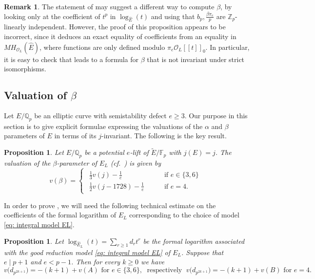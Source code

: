 \documentclass{amsart}
\newcommand{\Qp}{\mathbb{Q}_p}
\newtheorem{proposition}[theorem]{Proposition}
\theoremstyle{definition}
\newtheorem{remark}[theorem]{Remark}
\newcommand{\Z}{\mathbb{Z}}
\newcommand{\Q}{\mathbb{Q}}
\numberwithin{theorem}{section}
\numberwithin{equation}{section}
\begin{document}
\begin{remark}\label{rmk: Kawachi error}
    The statement of \cite[Proposition 2.2.1]{Kawachi} may suggest a different way to compute $\beta$, by looking only at the coefficient of $t^p$ in $\log_{\widehat{E}}(t)$ and using that $b_p, \frac{\beta \pi_e}{p}$ are $\Z_p$-linearly independent. However, the proof of this proposition appears to be incorrect, since it deduces an exact equality of coefficients from an equality in $MH_{\mathcal{O}_L}(\widehat{E})$, where functions are only defined modulo $\pi_e \mathcal{O}_L[[t]]_0$. In particular, it is easy to check that \cite[Proposition 2.2.1]{Kawachi} leads to a formula for $\beta$ that is not invariant under strict isomorphisms.
\end{remark}


\subsection{Valuation of $\beta$}
Let $E/\Q_p$ be an elliptic curve with semistability defect $e \geq 3$.
Our purpose in this section is to give explicit formulae expressing the valuations of the $\alpha$ and $\beta$ parameters of $E$ in terms of its $j$-invariant. The following is the key result.

\begin{proposition}\label{prop: valuation beta}
Let $E/\Qp$ be a potential $e$-lift of $\tilde{E}/\mathbb{F}_p$ with $j(E)=j$. The valuation of the $\beta$-parameter of $E_L$ (cf.~) is given by
\[
v(\beta) = 
\begin{cases}
\begin{array}{lll}
\frac{1}{3}v(j) - \frac{1}{e} & \quad & \text{ if $e \in \{3,6\}$} \\
\frac{1}{2}v(j-1728) - \frac{1}{e} & \quad & \text{ if $e =4$.}
\end{array}
\end{cases}
\]
\end{proposition}


In order to prove , we will need the following technical estimate on the coefficients of the formal logarithm of $E_L$ corresponding to the choice of model \eqref{eq: integral model EL}.

\begin{proposition}\label{prop: valuation coefficients formal log}
Let $\log_{\hat{E}_L}(t)=\sum_{r \geq 1} d_r t^r$ be the formal logarithm associated with the good reduction model \eqref{eq: integral model EL} of $E_L$. Suppose that $e \mid p+1$ and $e<p-1$. Then for every $k\ge 0$ we have
\[
v\bigl(d_{p^{2k+1}}\bigr)=-(k+1)+v(A) \text{ for } e\in\{3,6\},
\; \text{ respectively } \;
v\bigl(d_{p^{2k+1}}\bigr)=-(k+1)+v(B) \text{ for }e=4.
\]
\end{proposition}
\end{document}
